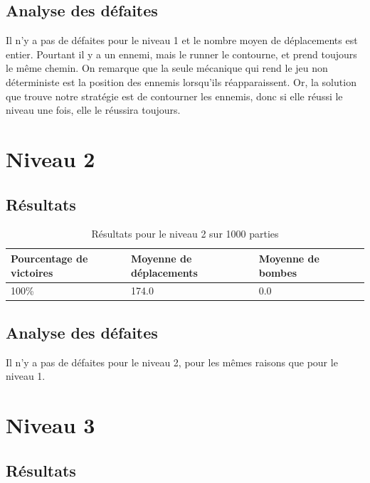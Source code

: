 \subsection{Analyse des défaites}

Il n'y a pas de défaites pour le niveau 1 et le nombre moyen de déplacements est entier.
Pourtant il y a un ennemi, mais le runner le contourne, et prend toujours le même chemin.
\newline
On remarque que la seule mécanique qui rend le jeu non déterministe est la position des ennemis lorsqu'ils réapparaissent.
Or, la solution que trouve notre stratégie est de contourner les ennemis, donc si elle réussi le niveau une fois, elle le réussira toujours.

\section{Niveau 2}

\subsection{Résultats}

\begin{table}[!htpb]
    \begin{tabularx}{\textwidth}{lXXX}
        \toprule
        Pourcentage de victoires & Moyenne de déplacements & Moyenne de bombes \\
        \midrule
        100\% & 174.0 & 0.0 \\
        \bottomrule
    \end{tabularx}
    \caption{Résultats pour le niveau 2 sur 1000 parties}
    \label{tab:res-niveau-2}
\end{table}

\subsection{Analyse des défaites}

Il n'y a pas de défaites pour le niveau 2, pour les mêmes raisons que pour le niveau 1.

\section{Niveau 3}

\subsection{Résultats}

